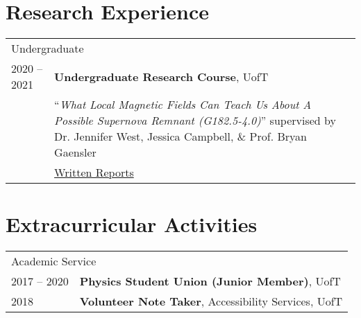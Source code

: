 \documentclass[10pt]{res} %
\begin{document}
\begin{resume}
\section{\Large Research Experience}
\vspace{-5pt} %
\noindent\makebox[\linewidth]{\rule{\textwidth}{0.4pt}}
\vspace{-20pt} %

\begin{table}[h!]
\begin{tabularx}{\textwidth}{ @{} p{6.5em} X @{} }
\multicolumn{2}{l}{ \rule{0pt}{3ex} \large \hspace{-12pt} Undergraduate \dotfill \rule[-1.2ex]{0pt}{0pt}} \\ 
2020 -- 2021 & \textbf{Undergraduate Research Course}, UofT \\
                     & ``\textit{What Local Magnetic Fields Can Teach Us About A Possible Supernova Remnant (G182.5-4.0)}'' supervised by Dr. Jennifer West, Jessica Campbell, $\&$ Prof. Bryan Gaensler \\
                     & \href{https://github.com/parampreetastro/AST425}{Written Reports}
\end{tabularx}
\end{table}



\section{\Large Extracurricular Activities}
\vspace{-5pt} %
\noindent\makebox[\linewidth]{\rule{\textwidth}{0.4pt}}
\vspace{-20pt} %

\begin{table}[h!]
\begin{tabularx}{\textwidth}{ @{} p{6.5em} X @{} }
\multicolumn{2}{l}{ \rule{0pt}{3ex} \large \hspace{-12pt} Academic Service \dotfill \rule[-1.2ex]{0pt}{0pt}} \\ 
2017 -- 2020 & \textbf{Physics Student Union (Junior Member)}, UofT \\
2018 & \textbf{Volunteer Note Taker}, Accessibility Services, UofT \\


\end{tabularx}
\end{table}
\end{resume}
\end{document}
